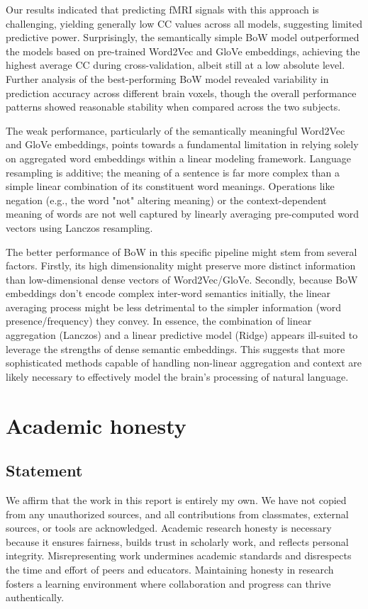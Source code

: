 \documentclass[10pt,letterpaper]{article}
\begin{document}
Our results indicated that predicting fMRI signals with this approach is challenging, yielding generally low CC values across all models, suggesting limited predictive power. Surprisingly, the semantically simple BoW model outperformed the models based on pre-trained Word2Vec and GloVe embeddings, achieving the highest average CC during cross-validation, albeit still at a low absolute level. Further analysis of the best-performing BoW model revealed variability in prediction accuracy across different brain voxels, though the overall performance patterns showed reasonable stability when compared across the two subjects.

The weak performance, particularly of the semantically meaningful Word2Vec and GloVe embeddings, points towards a fundamental limitation in relying solely on aggregated word embeddings within a linear modeling framework. Language resampling is additive; the meaning of a sentence is far more complex than a simple linear combination of its constituent word meanings. Operations like negation (e.g., the word "not" altering meaning) or the context-dependent meaning of words are not well captured by linearly averaging pre-computed word vectors using Lanczos resampling.

The better performance of BoW in this specific pipeline might stem from several factors. Firstly, its high dimensionality might preserve more distinct information than low-dimensional dense vectors of Word2Vec/GloVe. Secondly, because BoW embeddings don't encode complex inter-word semantics initially, the linear averaging process might be less detrimental to the simpler information (word presence/frequency) they convey. In essence, the combination of linear aggregation (Lanczos) and a linear predictive model (Ridge) appears ill-suited to leverage the strengths of dense semantic embeddings. This suggests that more sophisticated methods capable of handling non-linear aggregation and context are likely necessary to effectively model the brain's processing of natural language.

\newpage

\printbibliography

\appendix
\section{Academic honesty}
\subsection{Statement}
We affirm that the work in this report is entirely my own. We have not copied from any unauthorized sources, and all contributions from classmates, external sources, or tools are acknowledged. Academic research honesty is necessary because it ensures fairness, builds trust in scholarly work, and reflects personal integrity. Misrepresenting work undermines academic standards and disrespects the time and effort of peers and educators. Maintaining honesty in research fosters a learning environment where collaboration and progress can thrive authentically.
\end{document}
